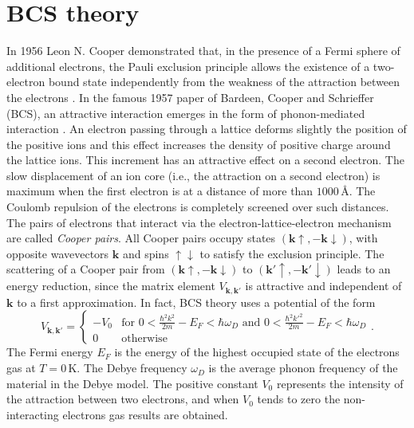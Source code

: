 \documentclass[../main/main.tex]{subfiles}
\begin{document}
\section{BCS theory}
In 1956 Leon N. Cooper demonstrated that, in the presence of a Fermi sphere of additional electrons, the Pauli exclusion principle allows the existence of a two-electron bound state independently from the weakness of the attraction between the electrons \cite{PhysRev.104.1189}. In the famous 1957 paper of Bardeen, Cooper and Schrieffer (BCS), an attractive interaction emerges in the form of phonon-mediated interaction \cite{BCS_theory}. An electron passing through a lattice deforms slightly the position of the positive ions and this effect increases the density of positive charge around the lattice ions. This increment has an attractive effect on a second electron. The slow displacement of an ion core (i.e., the attraction on a second electron) is maximum when the first electron is at a distance of more than $1000\,\text{\AA}$. The Coulomb repulsion of the electrons is completely screened over such distances.\\
The pairs of electrons that interact via the electron-lattice-electron mechanism are called \textit{Cooper pairs}. All Cooper pairs occupy states $(\boldsymbol{k}\uparrow,-\boldsymbol{k}\downarrow)$, with opposite wavevectors $\boldsymbol{k}$ and spins $\uparrow \downarrow$ to satisfy the exclusion principle. The scattering of a Cooper pair from $(\boldsymbol{k}\uparrow,-\boldsymbol{k}\downarrow)$ to $(\boldsymbol{k'}\uparrow,-\boldsymbol{k'}\downarrow)$ leads to an energy reduction, since the matrix element $V_{\boldsymbol{k},\boldsymbol{k'}}$ is attractive and independent of $\boldsymbol{k}$ to a first approximation. In fact, BCS theory uses a potential of the form
\begin{equation} \label{eq:V_kk'}
  V_{\boldsymbol{k},\boldsymbol{k'}} =
    \begin{cases}
      -V_0 & \text{for } 0<\frac{\hbar^2 k^2}{2m}-E_F<\hbar \omega_D \text{ and } 0<\frac{\hbar^2 k'^2}{2m}-E_F<\hbar \omega_D\\
      0 & \text{otherwise}
    \end{cases}.
\end{equation}
The Fermi energy $E_F$ is the energy of the highest occupied state of the electrons gas at $T=0\,$K. The Debye frequency $\omega_D$ is the average phonon frequency of the material in the Debye model. The positive constant $V_0$ represents the intensity of the attraction between two electrons, and when $V_0$ tends to zero the non-interacting electrons gas results are obtained.\\
\end{document}
